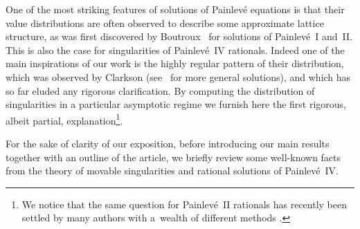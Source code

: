 \documentclass[pdftex]{sigma}
\numberwithin{equation}{section}
\begin{document}
One of the most striking features of solutions of Painlev\'e equations is that their value distributions are often
observed to describe some approximate lattice structure, as was f\/irst discovered by Boutroux~\cite{boutroux} for solutions of Painlev\'e~I
and~II.
This is also the case for singularities of Painlev\'e~IV rationals. Indeed one of the main
inspirations of our work is the highly regular pattern of their distribution, which was
observed by Clarkson \cite{clarkson2003piv} (see~\cite{reegerfornberg2014} for more general solutions),
and which has so far eluded any rigorous clarif\/ication. By computing
the distribution of singularities in a particular asymptotic regime we furnish here the f\/irst rigorous, albeit partial, explanation\footnote{We notice that the same question for Painlev\'e~II rationals has recently been settled by many authors with a~wealth of dif\/ferent methods \cite{bertolavorob,buckinghamnoncr,buckinghamcr,millerrational,roffelsenirrational,roffelsennumber}.}.

For the sake of clarity of our exposition, before introducing our main results together with an outline of the article,
we brief\/ly review some well-known facts from the theory of
movable singularities and rational solutions of Painlev\'e~IV.
\end{document}
